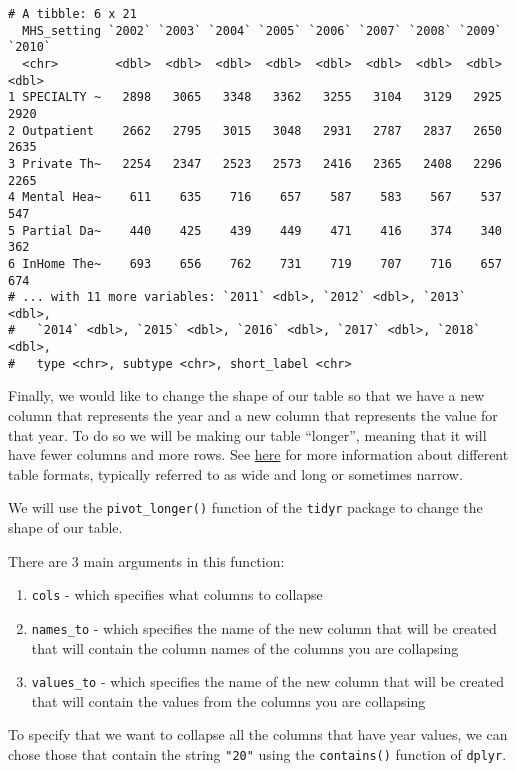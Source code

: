 \documentclass[
]{article}
\providecommand{\tightlist}{%
  \setlength{\itemsep}{0pt}\setlength{\parskip}{0pt}}
\begin{document}
\begin{verbatim}
# A tibble: 6 x 21
  MHS_setting `2002` `2003` `2004` `2005` `2006` `2007` `2008` `2009` `2010`
  <chr>        <dbl>  <dbl>  <dbl>  <dbl>  <dbl>  <dbl>  <dbl>  <dbl>  <dbl>
1 SPECIALTY ~   2898   3065   3348   3362   3255   3104   3129   2925   2920
2 Outpatient    2662   2795   3015   3048   2931   2787   2837   2650   2635
3 Private Th~   2254   2347   2523   2573   2416   2365   2408   2296   2265
4 Mental Hea~    611    635    716    657    587    583    567    537    547
5 Partial Da~    440    425    439    449    471    416    374    340    362
6 InHome The~    693    656    762    731    719    707    716    657    674
# ... with 11 more variables: `2011` <dbl>, `2012` <dbl>, `2013` <dbl>,
#   `2014` <dbl>, `2015` <dbl>, `2016` <dbl>, `2017` <dbl>, `2018` <dbl>,
#   type <chr>, subtype <chr>, short_label <chr>
\end{verbatim}

Finally, we would like to change the shape of our table so that we have
a new column that represents the year and a new column that represents
the value for that year. To do so we will be making our table
``longer'', meaning that it will have fewer columns and more rows. See
\href{https://en.wikipedia.org/wiki/Wide_and_narrow_data}{here} for more
information about different table formats, typically referred to as wide
and long or sometimes narrow.

We will use the \texttt{pivot\_longer()} function of the \texttt{tidyr}
package to change the shape of our table.

There are 3 main arguments in this function:

\begin{enumerate}
\def\labelenumi{\arabic{enumi}.}
\tightlist
\item
  \texttt{cols} - which specifies what columns to collapse\\
\item
  \texttt{names\_to} - which specifies the name of the new column that
  will be created that will contain the column names of the columns you
  are collapsing\\
\item
  \texttt{values\_to} - which specifies the name of the new column that
  will be created that will contain the values from the columns you are
  collapsing
\end{enumerate}

To specify that we want to collapse all the columns that have year
values, we can chose those that contain the string \texttt{"20"} using
the \texttt{contains()} function of \texttt{dplyr}.
\end{document}
